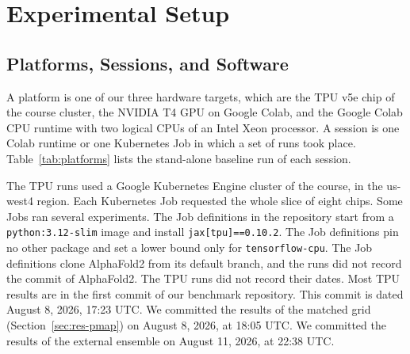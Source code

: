 \section{Experimental Setup}\label{sec:method}

\subsection{Platforms, Sessions, and Software}\label{sec:platforms}
\begin{table}[t]
\caption{\capTabPlatforms}\label{tab:platforms}
\centering\small{}
\end{table}

A platform is one of our three hardware targets, which are the TPU v5e chip of the course cluster, the NVIDIA T4 GPU on Google Colab, and the Google Colab CPU runtime with two logical CPUs of an Intel Xeon processor. %
A session is one Colab runtime or one Kubernetes Job in which a set of runs took place.
Table~\ref{tab:platforms} lists the stand-alone baseline run of each session.

The TPU runs used a Google Kubernetes Engine cluster of the course, in the us-west4 region. Each Kubernetes Job
requested the whole slice of eight chips. Some Jobs ran several experiments.
The Job definitions in the repository start from a \texttt{python:3.12-slim} image and install \texttt{jax[tpu]==0.10.2}. %
The Job definitions pin no other package and set a lower bound only for \texttt{tensorflow-cpu}.
The Job definitions clone AlphaFold2 from its default branch, and the runs did not record the commit of AlphaFold2.
 The TPU runs did not record their dates.
Most TPU results are in the first commit of our benchmark repository. This commit is dated August 8, 2026, 17:23 UTC. %
We committed the results of the matched grid (Section~\ref{sec:res-pmap}) on August 8, 2026, at 18:05 UTC. We committed the results of the external ensemble on August 11, 2026, at 22:38 UTC. %

